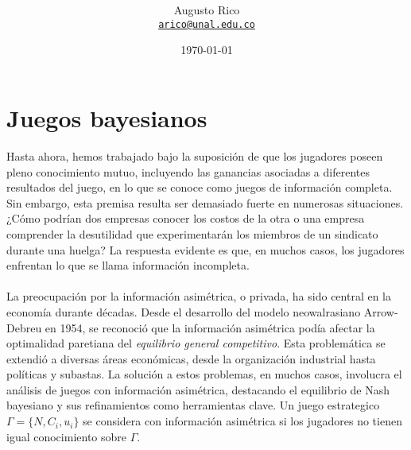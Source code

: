 \documentclass[11pt]{article}
\title{\text{Microeconomia III - $8^a$ Monitoria}
}
\author{Augusto Rico\\%
    \href{mailto:arico@unal.edu.co}{\texttt{arico@unal.edu.co}}
    }
\date{\today}
\begin{document}
\maketitle


\section{Juegos bayesianos}

\begin{flushleft}
    Hasta ahora, hemos trabajado bajo la suposición de que los jugadores poseen pleno conocimiento mutuo, incluyendo las ganancias asociadas a diferentes resultados del juego, en lo que se conoce como juegos de información completa. Sin embargo, esta premisa resulta ser demasiado fuerte en numerosas situaciones. ¿Cómo podrían dos empresas conocer los costos de la otra o una empresa comprender la desutilidad que experimentarán los miembros de un sindicato durante una huelga? La respuesta evidente es que, en muchos casos, los jugadores enfrentan lo que se llama información incompleta.\\~\\

    La preocupación por la información asimétrica, o privada, ha sido central en la economía durante décadas. Desde el desarrollo del modelo neowalrasiano Arrow-Debreu en 1954, se reconoció que la información asimétrica podía afectar la optimalidad paretiana del \textit{equilibrio general competitivo}. Esta problemática se extendió a diversas áreas económicas, desde la organización industrial hasta políticas y subastas. La solución a estos problemas, en muchos casos, involucra el análisis de juegos con información asimétrica, destacando el equilibrio de Nash bayesiano y sus refinamientos como herramientas clave. Un juego estrategico $\Gamma=\{N,C_i,u_i\}$ se considera con información asimétrica si los jugadores no tienen igual conocimiento sobre $\Gamma$.\\~\\


\end{flushleft}
\end{document}
